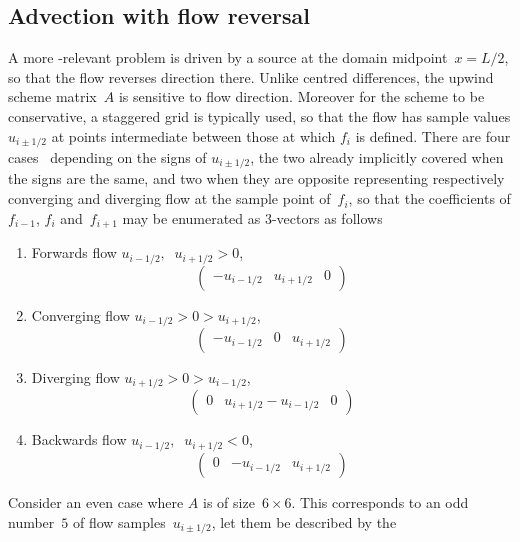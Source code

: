 \subsection{Advection with flow reversal}\label{sec:reverse}
A more \nep-relevant problem is driven by a source at the domain midpoint~$x=L/2$, so that the
flow reverses direction there. Unlike centred differences, the upwind scheme matrix~$A$ is
sensitive to flow direction. Moreover for the scheme to be conservative, a staggered grid
is typically used, so that the flow has sample values $u_{i\pm 1/2}$ at points
intermediate between those at which $f_i$ is defined. There are four
cases~\cite[\S\,5.2-2]{patankar} depending
on the signs of $u_{i\pm 1/2}$, the two already implicitly covered when the signs are
the same, and two when they are opposite representing respectively converging and diverging
flow at the sample point of~$f_i$, so that the coefficients of $f_{i-1}$, $f_i$ and~$f_{i+1}$
may be enumerated as 3-vectors as follows
\begin{enumerate}
\item Forwards flow $u_{i-1/2},\;\; u_{i+1/2} > 0$,
\begin{equation}\begin{pmatrix}
-u_{i-1/2} & u_{i+1/2} & 0
\end{pmatrix} \end{equation}
\item Converging flow $u_{i-1/2}>0>u_{i+1/2}$,
\begin{equation}\begin{pmatrix}
-u_{i-1/2} & 0 & u_{i+1/2} 
\end{pmatrix} \end{equation}
\item Diverging flow $u_{i+1/2}>0>u_{i-1/2}$,
\begin{equation}\begin{pmatrix}
0 & u_{i+1/2}-u_{i-1/2} & 0
\end{pmatrix} \end{equation}
\item Backwards flow $u_{i-1/2},\;\; u_{i+1/2} < 0$,
\begin{equation}\begin{pmatrix}
0 & -u_{i-1/2} & u_{i+1/2}
\end{pmatrix} \end{equation}
\end{enumerate}
Consider an even case where $A$ is of size~$6\times6$. This corresponds
to an odd number~$5$ of flow samples~$u_{i\pm 1/2}$, let them be described by the
